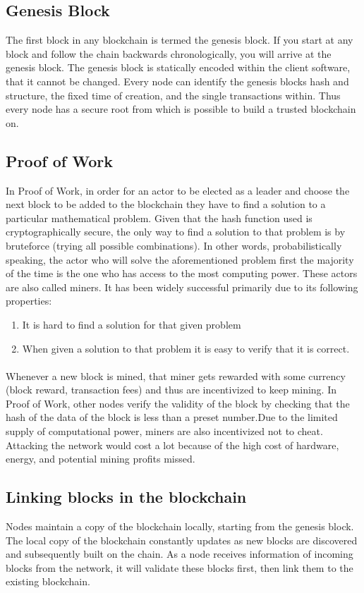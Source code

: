 \subsection{Genesis Block}
The first block in any blockchain is termed the genesis block. If you start at any block and
follow the chain backwards chronologically, you will arrive at the genesis block. The genesis
block is statically encoded within the client software, that it cannot be changed. Every node
can identify the genesis blocks hash and structure, the fixed time of creation, and the single
transactions within. Thus every node has a secure root from which is possible to build a trusted
blockchain on.
\subsection{Proof of Work}
In Proof of Work, in order for an actor to be elected as a leader and choose the next block to
be added to the blockchain they have to find a solution to a particular mathematical problem.
Given that the hash function used is cryptographically secure, the only way to find a solution to
that problem is by bruteforce (trying all possible combinations). In other words, probabilistically
speaking, the actor who will solve the aforementioned problem first the majority of the time is
the one who has access to the most computing power. These actors are also called miners.
It has been widely successful primarily due to its following properties:
\begin{enumerate}
\item It is hard to find a solution for that given problem
\item When given a solution to that problem it is easy to verify that it is correct.
\end{enumerate}
\paragraph{}Whenever a new block is mined, that miner gets rewarded with some currency (block reward,
transaction fees) and thus are incentivized to keep mining. In Proof of Work, other nodes verify
the validity of the block by checking that the hash of the data of the block is less than a preset
number.Due to the limited supply of computational power, miners are also incentivized not to
cheat. Attacking the network would cost a lot because of the high cost of hardware, energy, and
potential mining profits missed.
\subsection{Linking blocks in the blockchain}
Nodes maintain a copy of the blockchain locally, starting from the genesis block. The local copy of the blockchain constantly updates as new blocks are discovered and subsequently built on the chain. As a node receives information of incoming blocks from the network, it will validate these blocks first, then link them to the existing blockchain.
